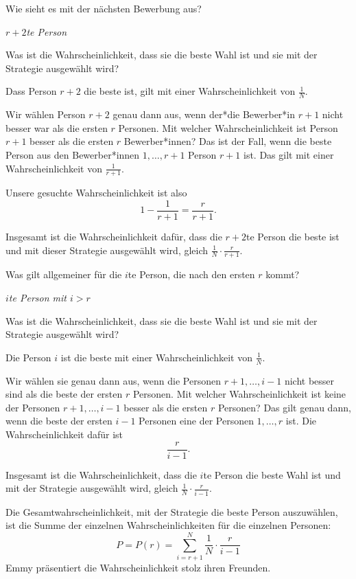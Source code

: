 Wie sieht es mit der nächsten Bewerbung aus?
\begin{box}

	\emph{$r+2$te Person}

	Was ist die Wahrscheinlichkeit, dass sie die beste Wahl ist und sie mit der Strategie ausgewählt wird?

	Dass Person $r+2$ die beste ist, gilt mit einer Wahrscheinlichkeit von $\frac 1N$​.

	Wir wählen Person $r+2$ genau dann aus, wenn der*die Bewerber*in $r+1$ nicht besser war als die ersten $r$ Personen. Mit welcher Wahrscheinlichkeit ist Person $r+1$ besser als die ersten $r$ Bewerber*innen? Das ist der Fall, wenn die beste Person aus den Bewerber*innen $1,\ldots, r+1$ Person $r+1$ ist. Das gilt mit einer Wahrscheinlichkeit von $\frac 1{r+1}$​.

	Unsere gesuchte Wahrscheinlichkeit ist also
	\[ 1-\frac 1{r+1}=\frac r{r+1}.\]

	Insgesamt ist die Wahrscheinlichkeit dafür, dass die $r+2$te Person die beste ist und mit dieser Strategie ausgewählt wird, gleich $\frac1N\cdot\frac{r}{r+1}$.
\end{box}
Was gilt allgemeiner für die $i$te Person, die nach den ersten $r$ kommt?
\begin{box}
	\emph{$i$te Person mit $i>r$}
	
	Was ist die Wahrscheinlichkeit, dass sie die beste Wahl ist und sie mit der Strategie ausgewählt wird?
	
	Die Person $i$ ist die beste mit einer Wahrscheinlichkeit von $\frac 1N$​.
	
	Wir wählen sie genau dann aus, wenn die Personen $r+1, \ldots , i-1$ nicht besser sind als die beste der ersten $r$ Personen. Mit welcher Wahrscheinlichkeit ist keine der Personen $r+1,\ldots,i-1$ besser als die ersten $r$ Personen? Das gilt genau dann, wenn die beste der ersten $i-1$ Personen eine der Personen $1,\ldots,r$ ist. Die Wahrscheinlichkeit dafür ist
	\[\frac r{i-1}.\]
	
	Insgesamt ist die Wahrscheinlichkeit, dass die $i$te Person die beste Wahl ist und mit der Strategie ausgewählt wird, gleich $\frac1N\cdot \frac{r}{i-1}$​.
\end{box}
Die Gesamtwahrscheinlichkeit, mit der Strategie die beste Person auszuwählen, ist die Summe der einzelnen Wahrscheinlichkeiten für die einzelnen Personen:
\[P=P(r)=\sum_{i=r+1}^N\frac{1}{N}\cdot\frac{r}{i-1}\]
Emmy präsentiert die Wahrscheinlichkeit stolz ihren Freunden.

